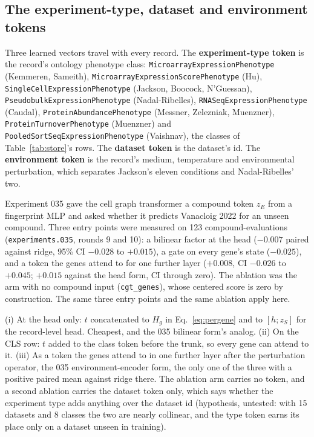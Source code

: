 \subsection{The experiment-type, dataset and environment tokens}
\label{sec:output-tokens}

Three learned vectors travel with every record. The \textbf{experiment-type token} is the
record's ontology phenotype class: \texttt{MicroarrayExpressionPhenotype} (Kemmeren,
Sameith), \texttt{MicroarrayExpressionScorePhenotype} (Hu),
\texttt{SingleCellExpressionPhenotype} (Jackson, Boocock, N'Guessan),
\texttt{PseudobulkExpressionPhenotype} (Nadal-Ribelles), \texttt{RNASeqExpressionPhenotype}
(Caudal), \texttt{ProteinAbundancePhenotype} (Messner, Zelezniak, Muenzner),
\texttt{ProteinTurnoverPhenotype} (Muenzner) and \texttt{PooledSortSeqExpressionPhenotype}
(Vaishnav), the classes of Table~\ref{tab:store}'s rows. The \textbf{dataset token} is the
dataset's id. The \textbf{environment token} is the record's medium, temperature and
environmental perturbation, which separates Jackson's eleven conditions and Nadal-Ribelles'
two.

Experiment 035 gave the cell graph transformer a compound token $z_E$ from a fingerprint
MLP and asked whether it predicts Vanacloig 2022 for an unseen compound. Three entry points
were measured on 123 compound-evaluations (\texttt{experiments.035}, rounds 9 and 10): a
bilinear factor at the head ($-0.007$ paired against ridge, 95\% CI $-0.028$ to $+0.015$),
a gate on every gene's state ($-0.025$), and a token the genes attend to for one further
layer ($+0.008$, CI $-0.026$ to $+0.045$; $+0.015$ against the head form, CI through zero).
The ablation was the arm with no compound input (\texttt{cgt\_genes}), whose centered score
is zero by construction. The same three entry points and the same ablation apply here.

(i) At the head only: $t$ concatenated to $H_g$ in Eq.~\ref{eq:pergene} and to $[h ; z_S]$
for the record-level head. Cheapest, and the 035 bilinear form's analog. (ii) On the CLS
row: $t$ added to the class token before the trunk, so every gene can attend to it. (iii)
As a token the genes attend to in one further layer after the perturbation operator, the
035 environment-encoder form, the only one of the three with a positive paired mean
against ridge there. The ablation arm carries no token, and a second ablation carries the
dataset token only, which says whether the experiment type adds anything over the dataset
id (hypothesis, untested: with 15 datasets and 8 classes the two are nearly collinear, and
the type token earns its place only on a dataset unseen in training).

